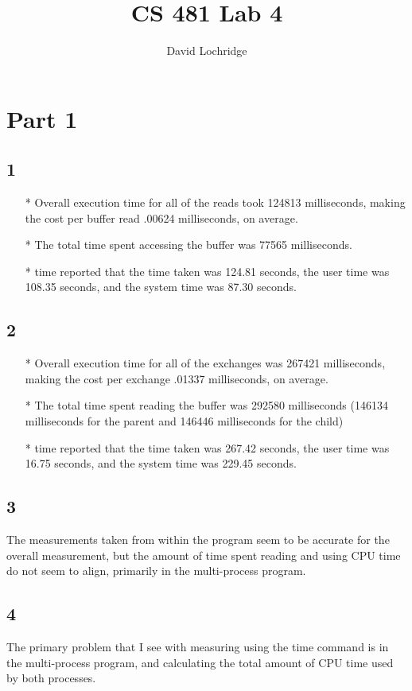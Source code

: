 \documentclass[]{scrartcl}
\title{CS 481 Lab 4}
\author{David Lochridge}
\begin{document}
\maketitle

\section*{Part 1}
\subsection*{1}
\begin{itemize}
\item[*] Overall execution time for all of the reads took 124813 milliseconds, making the cost per buffer read .00624 milliseconds, on average.
\item[*] The total time spent accessing the buffer was 77565 milliseconds.
\item[*] time reported that the time taken was 124.81 seconds, the user time was 108.35  seconds, and the system time was 87.30 seconds.
\end{itemize}
\subsection*{2}
\begin{itemize}
\item[*] Overall execution time for all of the exchanges was 267421 milliseconds, making the cost per exchange .01337 milliseconds, on average.
\item[*] The total time spent reading the buffer was 292580 milliseconds (146134 milliseconds for the parent and 146446 milliseconds for the child)
\item[*] time reported that the time taken was 267.42 seconds, the user time was 16.75 seconds, and the system time was 229.45 seconds.
\end{itemize}
\subsection*{3}
The measurements taken from within the program seem to be accurate for the overall measurement, but the amount of time spent reading and using CPU time do not seem to align, primarily in the multi-process program.
\subsection*{4}
The primary problem that I see with measuring using the time command is in the multi-process program, and calculating the total amount of CPU time used by both processes.
\end{document}
